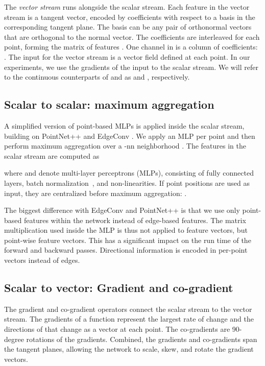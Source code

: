 \documentclass[acmtog, authorversion]{acmart}
\begin{document}
The \textit{vector stream} runs alongside the scalar stream. Each feature in the vector stream is a tangent vector, encoded by coefficients  with respect to a basis in the corresponding tangent plane.
The basis can be any pair of orthonormal vectors that are orthogonal to the normal vector.
The coefficients are interleaved for each point, forming the matrix of features . One channel in  is a column of coefficients: . The input for the vector stream is a vector field defined at each point. In our experiments, we use the gradients of the input to the scalar stream. We will refer to the continuous counterparts of  and  as  and , respectively.

\subsection{Scalar to scalar: maximum aggregation}
A simplified version of point-based MLPs is applied inside the scalar stream, building on PointNet++ \cite{Qi2017b} and EdgeConv \cite{Wang2019}. We apply an MLP per point and then perform maximum aggregation over a -nn neighborhood . The features in the scalar stream are computed as

where  and  denote multi-layer perceptrons (MLPs), consisting of fully connected layers, batch normalization~\cite{Ioffe2015}, and non-linearities. If point positions are used as input, they are centralized before maximum aggregation: .

The biggest difference with EdgeConv and PointNet++ is that we use only point-based features within the network instead of edge-based features. The matrix multiplication used inside the MLP is thus not applied to  feature vectors, but  point-wise feature vectors. This has a significant impact on the run time of the forward and backward passes. Directional information is encoded in per-point vectors instead of edges.

\subsection{Scalar to vector: Gradient and co-gradient}
The gradient and co-gradient operators connect the scalar stream to the vector stream. The gradients of a function represent the largest rate of change and the directions of that change as a vector at each point.
The co-gradients are 90-degree rotations of the gradients. Combined, the gradients and co-gradients span the tangent planes, allowing the network to scale, skew, and rotate the gradient vectors.
\end{document}
